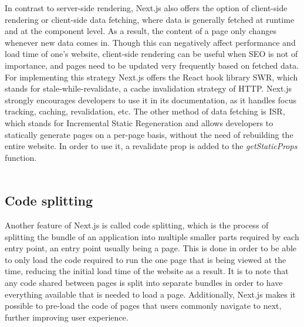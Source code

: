 In contrast to server-side rendering, Next.js also offers the
option of client-side rendering or client-side data fetching, where data is generally fetched at runtime and at the component level. As a
result, the content of a page only changes whenever new data comes in. Though this can negatively affect performance and load time of one's
website, client-side rendering can be useful when SEO is not of importance, and pages need to be updated very frequently based on fetched data.
For implementing this strategy Next.js offers the React hook library SWR, which stands for stale-while-revalidate, a cache invalidation strategy
of HTTP. Next.js strongly encourages developers to use it in its documentation, as it handles focus tracking, caching, revalidation, etc. The
other method of data fetching is ISR, which stands for Incremental Static Regeneration and allows developers to statically generate pages on a
per-page basis, without the need of rebuilding the entire website. In order to use it, a revalidate prop is added to the \emph{getStaticProps} function. \cite{NextjsDataFetching}
\\
\\
\subsection{Code splitting}
Another feature of Next.js is called code splitting, which is the process of splitting the bundle of an application into multiple smaller parts
required by each entry point, an entry point usually being a page. This is done in order to be able to only load the code required to run the one
page that is being viewed at the time, reducing the initial load time of the website as a result. It is to note that any code shared between pages
is split into separate bundles in order to have everything available that is needed to load a page. Additionally, Next.js makes it possible to
pre-load the code of pages that users commonly navigate to next, further improving user experience. \cite{NextjsCodeSplitting}
\\
\\
